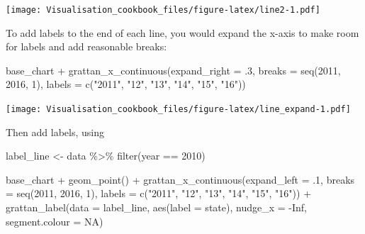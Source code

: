 \documentclass[
]{book}
\newenvironment{Shaded}{\begin{snugshade}}{\end{snugshade}}
\newcommand{\AttributeTok}[1]{\textcolor[rgb]{0.77,0.63,0.00}{#1}}
\newcommand{\ConstantTok}[1]{\textcolor[rgb]{0.00,0.00,0.00}{#1}}
\newcommand{\DecValTok}[1]{\textcolor[rgb]{0.00,0.00,0.81}{#1}}
\newcommand{\FunctionTok}[1]{\textcolor[rgb]{0.00,0.00,0.00}{#1}}
\newcommand{\NormalTok}[1]{#1}
\newcommand{\OtherTok}[1]{\textcolor[rgb]{0.56,0.35,0.01}{#1}}
\newcommand{\SpecialCharTok}[1]{\textcolor[rgb]{0.00,0.00,0.00}{#1}}
\newcommand{\StringTok}[1]{\textcolor[rgb]{0.31,0.60,0.02}{#1}}
\begin{document}
\texttt{[image: Visualisation\_cookbook\_files/figure-latex/line2-1.pdf]}

To add labels to the end of each line, you would expand the x-axis to make room for labels and add reasonable breaks:

\begin{Shaded}
\begin{Highlighting}[]
\NormalTok{base\_chart }\SpecialCharTok{+}
  \FunctionTok{grattan\_x\_continuous}\NormalTok{(}\AttributeTok{expand\_right =}\NormalTok{ .}\DecValTok{3}\NormalTok{,}
                       \AttributeTok{breaks =} \FunctionTok{seq}\NormalTok{(}\DecValTok{2011}\NormalTok{, }\DecValTok{2016}\NormalTok{, }\DecValTok{1}\NormalTok{),}
                       \AttributeTok{labels =} \FunctionTok{c}\NormalTok{(}\StringTok{"2011"}\NormalTok{, }\StringTok{"12"}\NormalTok{, }\StringTok{"13"}\NormalTok{, }\StringTok{"14"}\NormalTok{, }\StringTok{"15"}\NormalTok{, }\StringTok{"16"}\NormalTok{)) }
\end{Highlighting}
\end{Shaded}

\texttt{[image: Visualisation\_cookbook\_files/figure-latex/line\_expand-1.pdf]}

Then add labels, using

\begin{Shaded}
\begin{Highlighting}[]
\NormalTok{label\_line }\OtherTok{\textless{}{-}}\NormalTok{ data }\SpecialCharTok{\%\textgreater{}\%} 
  \FunctionTok{filter}\NormalTok{(year }\SpecialCharTok{==} \DecValTok{2010}\NormalTok{)}

\NormalTok{base\_chart }\SpecialCharTok{+}
  \FunctionTok{geom\_point}\NormalTok{() }\SpecialCharTok{+}
  \FunctionTok{grattan\_x\_continuous}\NormalTok{(}\AttributeTok{expand\_left =}\NormalTok{ .}\DecValTok{1}\NormalTok{,}
                       \AttributeTok{breaks =} \FunctionTok{seq}\NormalTok{(}\DecValTok{2011}\NormalTok{, }\DecValTok{2016}\NormalTok{, }\DecValTok{1}\NormalTok{),}
                       \AttributeTok{labels =} \FunctionTok{c}\NormalTok{(}\StringTok{"2011"}\NormalTok{, }\StringTok{"12"}\NormalTok{, }\StringTok{"13"}\NormalTok{, }\StringTok{"14"}\NormalTok{, }\StringTok{"15"}\NormalTok{, }\StringTok{"16"}\NormalTok{)) }\SpecialCharTok{+} 
  \FunctionTok{grattan\_label}\NormalTok{(}\AttributeTok{data =}\NormalTok{ label\_line,}
                \FunctionTok{aes}\NormalTok{(}\AttributeTok{label =}\NormalTok{ state),}
                \AttributeTok{nudge\_x =} \SpecialCharTok{{-}}\ConstantTok{Inf}\NormalTok{,}
                \AttributeTok{segment.colour =} \ConstantTok{NA}\NormalTok{)}
\end{Highlighting}
\end{Shaded}
\end{document}

